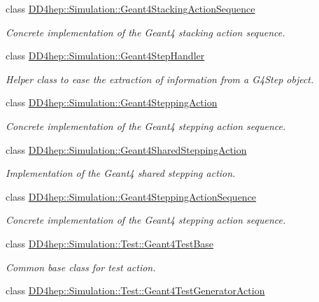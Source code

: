 \begin{DoxyCompactItemize}
class \hyperlink{class_d_d4hep_1_1_simulation_1_1_geant4_stacking_action_sequence}{D\+D4hep\+::\+Simulation\+::\+Geant4\+Stacking\+Action\+Sequence}
\begin{DoxyCompactList}\small\item\em Concrete implementation of the Geant4 stacking action sequence. \end{DoxyCompactList}\item 
class \hyperlink{class_d_d4hep_1_1_simulation_1_1_geant4_step_handler}{D\+D4hep\+::\+Simulation\+::\+Geant4\+Step\+Handler}
\begin{DoxyCompactList}\small\item\em Helper class to ease the extraction of information from a G4\+Step object. \end{DoxyCompactList}\item 
class \hyperlink{class_d_d4hep_1_1_simulation_1_1_geant4_stepping_action}{D\+D4hep\+::\+Simulation\+::\+Geant4\+Stepping\+Action}
\begin{DoxyCompactList}\small\item\em Concrete implementation of the Geant4 stepping action sequence. \end{DoxyCompactList}\item 
class \hyperlink{class_d_d4hep_1_1_simulation_1_1_geant4_shared_stepping_action}{D\+D4hep\+::\+Simulation\+::\+Geant4\+Shared\+Stepping\+Action}
\begin{DoxyCompactList}\small\item\em Implementation of the Geant4 shared stepping action. \end{DoxyCompactList}\item 
class \hyperlink{class_d_d4hep_1_1_simulation_1_1_geant4_stepping_action_sequence}{D\+D4hep\+::\+Simulation\+::\+Geant4\+Stepping\+Action\+Sequence}
\begin{DoxyCompactList}\small\item\em Concrete implementation of the Geant4 stepping action sequence. \end{DoxyCompactList}\item 
class \hyperlink{class_d_d4hep_1_1_simulation_1_1_test_1_1_geant4_test_base}{D\+D4hep\+::\+Simulation\+::\+Test\+::\+Geant4\+Test\+Base}
\begin{DoxyCompactList}\small\item\em Common base class for test action. \end{DoxyCompactList}\item 
class \hyperlink{class_d_d4hep_1_1_simulation_1_1_test_1_1_geant4_test_generator_action}{D\+D4hep\+::\+Simulation\+::\+Test\+::\+Geant4\+Test\+Generator\+Action}

\end{DoxyCompactItemize}
